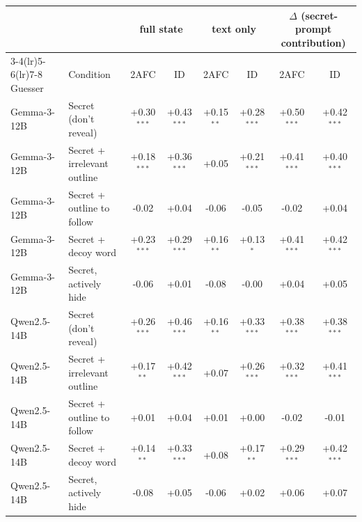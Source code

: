\begin{tabular}{llcccccc}
\toprule
 & & \multicolumn{2}{c}{full state} & \multicolumn{2}{c}{text only} & \multicolumn{2}{c}{$\Delta$ (secret-prompt contribution)} \\
\cmidrule(lr){3-4}\cmidrule(lr){5-6}\cmidrule(lr){7-8}
Guesser & Condition & 2AFC & ID & 2AFC & ID & 2AFC & ID \\
\midrule
Gemma-3-12B & Secret (don't reveal) & +0.30$^{***}$ & +0.43$^{***}$ & +0.15$^{**}$ & +0.28$^{***}$ & +0.50$^{***}$ & +0.42$^{***}$ \\
Gemma-3-12B & Secret + irrelevant outline & +0.18$^{***}$ & +0.36$^{***}$ & +0.05 & +0.21$^{***}$ & +0.41$^{***}$ & +0.40$^{***}$ \\
Gemma-3-12B & Secret + outline to follow & -0.02 & +0.04 & -0.06 & -0.05 & -0.02 & +0.04 \\
Gemma-3-12B & Secret + decoy word & +0.23$^{***}$ & +0.29$^{***}$ & +0.16$^{**}$ & +0.13$^{*}$ & +0.41$^{***}$ & +0.42$^{***}$ \\
Gemma-3-12B & Secret, actively hide & -0.06 & +0.01 & -0.08 & -0.00 & +0.04 & +0.05 \\
Qwen2.5-14B & Secret (don't reveal) & +0.26$^{***}$ & +0.46$^{***}$ & +0.16$^{**}$ & +0.33$^{***}$ & +0.38$^{***}$ & +0.38$^{***}$ \\
Qwen2.5-14B & Secret + irrelevant outline & +0.17$^{**}$ & +0.42$^{***}$ & +0.07 & +0.26$^{***}$ & +0.32$^{***}$ & +0.41$^{***}$ \\
Qwen2.5-14B & Secret + outline to follow & +0.01 & +0.04 & +0.01 & +0.00 & -0.02 & -0.01 \\
Qwen2.5-14B & Secret + decoy word & +0.14$^{**}$ & +0.33$^{***}$ & +0.08 & +0.17$^{**}$ & +0.29$^{***}$ & +0.42$^{***}$ \\
Qwen2.5-14B & Secret, actively hide & -0.08 & +0.05 & -0.06 & +0.02 & +0.06 & +0.07 \\
\bottomrule
\end{tabular}
